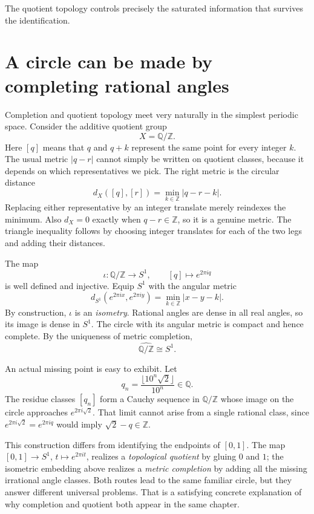 The quotient topology controls precisely the saturated information that survives the identification.

\section{A circle can be made by completing rational angles}

Completion and quotient topology meet very naturally in the simplest periodic space. Consider the additive quotient group
\[
 X=\mathbb Q/\mathbb Z.
\]
Here $[q]$ means that $q$ and $q+k$ represent the same point for every integer $k$. The usual metric $|q-r|$ cannot simply be written on quotient classes, because it depends on which representatives we pick. The right metric is the circular distance
\[
 \boxed{d_X([q],[r])=\min_{k\in\mathbb Z}|q-r-k|.}
\]
Replacing either representative by an integer translate merely reindexes the minimum. Also $d_X=0$ exactly when $q-r\in\mathbb Z$, so it is a genuine metric. The triangle inequality follows by choosing integer translates for each of the two legs and adding their distances.

The map
\[
 \iota:\mathbb Q/\mathbb Z\longrightarrow S^1,\qquad
 [q]\longmapsto e^{2\pi iq}
\]
is well defined and injective. Equip $S^1$ with the angular metric
\[
 d_{S^1}(e^{2\pi ix},e^{2\pi iy})
 =\min_{k\in\mathbb Z}|x-y-k|.
\]
By construction, $\iota$ is an \emph{isometry}. Rational angles are dense in all real angles, so its image is dense in $S^1$. The circle with its angular metric is compact and hence complete. By the uniqueness of metric completion,
\[
 \boxed{\widehat{\mathbb Q/\mathbb Z}\cong S^1.}
\]

An actual missing point is easy to exhibit. Let
\[
 q_n=\frac{\lfloor10^n\sqrt2\rfloor}{10^n}\in\mathbb Q.
\]
The residue classes $[q_n]$ form a Cauchy sequence in $\mathbb Q/\mathbb Z$ whose image on the circle approaches $e^{2\pi i\sqrt2}$. That limit cannot arise from a single rational class, since $e^{2\pi i\sqrt2}=e^{2\pi iq}$ would imply $\sqrt2-q\in\mathbb Z$.

This construction differs from identifying the endpoints of $[0,1]$. The map $[0,1]\to S^1$, $t\mapsto e^{2\pi it}$, realizes a \emph{topological quotient} by gluing $0$ and $1$; the isometric embedding above realizes a \emph{metric completion} by adding all the missing irrational angle classes. Both routes lead to the same familiar circle, but they answer different universal problems. That is a satisfying concrete explanation of why completion and quotient both appear in the same chapter.

